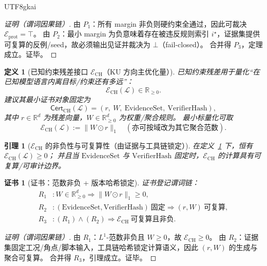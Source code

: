 \documentclass[12pt]{article}
\newtheorem{definition}{定义}[section]
\newtheorem{lemma}{引理}[section]
\newtheorem{Certificate}{证书}[section]
\newcommand{\RR}{\mathbb{R}}
\begin{document}
\begin{CJK*}{UTF8}{gkai}
\begin{proof}[证明（谓词因果链）]
由 $P_1$：所有 margin 非负则硬约束全通过，因此可裁决 $\mathcal{E}_{\mathrm{prot}}=\top$。
由 $P_2$：最小 margin 为负意味着存在被违反规则索引 $i^\star$，证据集提供可复算的反例/seed，故必须输出见证并裁决为 $\bot$（fail-closed）。
合并得 $P_3$，定理成立。证毕。
\end{proof}

\begin{definition}[已知约束残差接口 $\mathcal{E}_{\mathrm{CH}}$（KU 方向主优化量）]
\label{def:eng-minimal-ech}
已知约束残差用于量化“在已知模型语言内离目标/约束还有多远”：
\[
  \mathcal{E}_{\mathrm{CH}}(\mathcal{L})\in\RR_{\ge 0}.
\]
建议其最小证书对象固定为
\[
  \mathsf{Cert}_{\mathrm{CH}}(\mathcal{L})=(r,\ W,\ \mathrm{EvidenceSet},\ \mathrm{VerifierHash}),
\]
其中 $r\in\RR^d$ 为残差向量，$W\in\RR^d_{\ge 0}$ 为权重/聚合规则。
最小标量化可取
\[
  \mathcal{E}_{\mathrm{CH}}(\mathcal{L}):=\lVert W\odot r\rVert_1
  \quad(\text{亦可按域改为其它聚合范数}).
\]
\end{definition}

\begin{lemma}[$\mathcal{E}_{\mathrm{CH}}$ 的非负性与可复算性（由证据与工具链锁定）]
\label{lem:eng-minimal-ech-nonneg}
在定义~\ref{def:eng-minimal-ech} 下，恒有 $\mathcal{E}_{\mathrm{CH}}(\mathcal{L})\ge 0$；
并且当 $\mathrm{EvidenceSet}$ 与 $\mathrm{VerifierHash}$ 固定时，$\mathcal{E}_{\mathrm{CH}}$ 的计算具有可复算/可审计边界。
\end{lemma}

\begin{Certificate}[证书：范数非负 + 版本哈希锁定]
\label{cert:eng-minimal-ech-nonneg}
证书登记谓词链：
\[
\begin{aligned}
  R_1 &: W\in\RR^d_{\ge 0}\Rightarrow \lVert W\odot r\rVert_1\ge 0,\\
  R_2 &: (\mathrm{EvidenceSet},\mathrm{VerifierHash})\ \text{固定}\Rightarrow (r,W)\ \text{可复算},\\
  R_3 &: (R_1)\wedge(R_2)\Rightarrow \mathcal{E}_{\mathrm{CH}}\ \text{可复算且非负}.
\end{aligned}
\]
\end{Certificate}

\begin{proof}[证明（谓词因果链）]
由 $R_1$：$L^1$-范数非负且 $W\ge 0$，故 $\mathcal{E}_{\mathrm{CH}}\ge 0$。
由 $R_2$：证据集固定工况/角点/脚本输入，工具链哈希锁定计算语义，因此 $(r,W)$ 的生成与聚合可复算。
合并得 $R_3$，引理成立。证毕。
\end{proof}


\end{CJK*}
\end{document}
